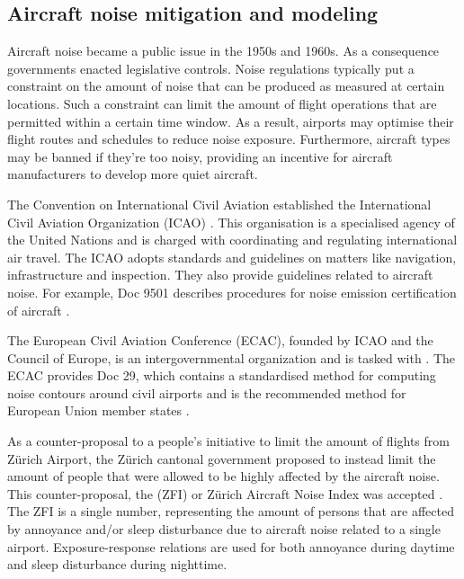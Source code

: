 \subsection{Aircraft noise mitigation and modeling}
Aircraft noise became a public issue in the 1950s and 1960s. As a consequence
governments enacted legislative controls. Noise regulations typically put a
constraint on the amount of noise that can be produced as measured at certain
locations. Such a constraint can limit the amount of flight operations that are
permitted within a certain time window. As a result, airports may optimise their
flight routes and schedules to reduce noise exposure. Furthermore, aircraft
types may be banned if they're too noisy, providing an incentive for
aircraft manufacturers to develop more quiet aircraft.


The Convention on International Civil Aviation established the International
Civil Aviation Organization (ICAO) \cite{ICAO2017}. This organisation is a
specialised agency of the United Nations and is charged with coordinating and
regulating international air travel. The ICAO adopts standards and guidelines on
matters like navigation, infrastructure and inspection. They also provide
guidelines related to aircraft noise. For example, Doc 9501 describes procedures
for noise emission certification of aircraft \cite{ICAO_9501}.


The European Civil Aviation Conference (ECAC), founded by ICAO and the Council
of Europe, is an intergovernmental organization and is tasked with  \cite{ECAC2017}. The ECAC provides Doc 29, which
contains a standardised method for computing noise contours around civil
airports \cite{Doc29_fourth_2016} and is the recommended method for European
Union member states \cite{directive_2002_49_ec}.

As a counter-proposal to a people's initiative to limit the amount of flights
from Z\"{u}rich Airport, the Z\"{u}rich cantonal government proposed to instead limit
the amount of people that were allowed to be highly affected by the aircraft
noise. This counter-proposal, the  (ZFI) or Z\"{u}rich
Aircraft Noise Index was accepted \cite{Schaffer2012}. The ZFI is a single
number, representing the amount of persons that are affected by annoyance and/or
sleep disturbance due to aircraft noise related to a single airport.
Exposure-response relations are used for both annoyance during daytime and sleep
disturbance during nighttime.

